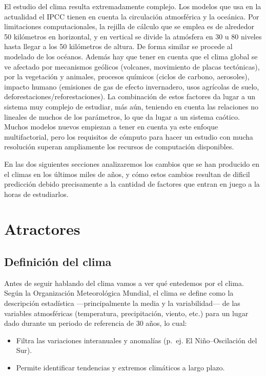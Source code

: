 \documentclass[
  10pt,
  a4paper,
  DIV=11,
  numbers=noendperiod,
  open=any]{scrreprt}
\numberwithin{equation}{chapter}
\numberwithin{equation}{chapter}
\renewcommand{\[}{\begin{equation}}
\renewcommand{\]}{\end{equation}}
\begin{document}
El estudio del clima resulta extremadamente complejo. Los modelos que
usa en la actualidad el IPCC tienen en cuenta la circulación atmosférica
y la oceánica. Por limitaciones computacionales, la rejilla de cálculo
que se emplea es de alrededor 50 kilómetros en horizontal, y en vertical
se divide la atmósfera en 30 u 80 niveles hasta llegar a los 50
kilómetros de altura. De forma similar se procede al modelado de los
océanos. Además hay que tener en cuenta que el clima global se ve
afectado por mecanismos geólicos (volcanes, movimiento de placas
tectónicas), por la vegetación y animales, procesos químicos (ciclos de
carbono, aerosoles), impacto humano (emisiones de gas de efecto
invernadero, usos agrícolas de suelo, deforestaciones/reforestaciones).
La combinación de estos factores da lugar a un sistema muy complejo de
estudiar, más aún, teniendo en cuenta las relaciones no lineales de
muchos de los parámetros, lo que da lugar a un sistema caótico. Muchos
modelos nuevos empiezan a tener en cuenta ya este enfoque
multifactorial, pero los requisitos de cómputo para hacer un estudio con
mucha resolución superan ampliamente los recursos de computación
disponibles.

En las dos siguientes secciones analizaremos los cambios que se han
producido en el climas en los últimos miles de años, y cómo estos
cambios resultan de dificil predicción debido precisamente a la cantidad
de factores que entran en juego a la horas de estudiarlos.


\chapter{Atractores}\label{atractores}

\section{Definición del clima}\label{definiciuxf3n-del-clima}

Antes de seguir hablando del clima vamos a ver qué entedemos por el
clima. Según la Organización Meteorológica Mundial, el clima se define
como la descripción estadística ---principalmente la media y la
variabilidad--- de las variables atmosféricas (temperatura,
precipitación, viento, etc.) para un lugar dado durante un periodo de
referencia de 30 años, lo cual:

\begin{itemize}
\item
  Filtra las variaciones interanuales y anomalías (p.~ej. El
  Niño--Oscilación del Sur).
\item
  Permite identificar tendencias y extremos climáticos a largo plazo.
\end{itemize}
\end{document}
